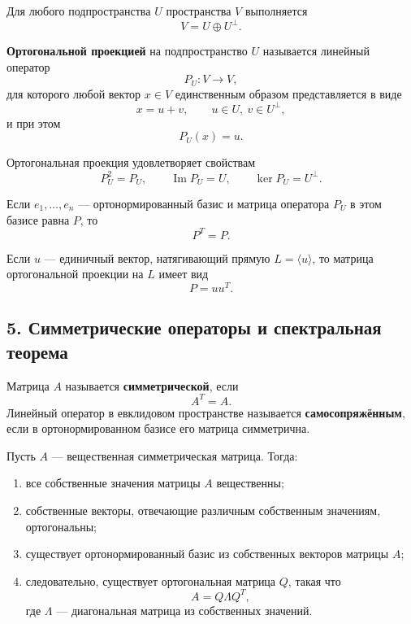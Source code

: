 Для любого подпространства $U$ пространства $V$ выполняется
\[
V = U \oplus U^\perp.
\]

\begin{definition}
\textbf{Ортогональной проекцией} на подпространство $U$ называется линейный оператор
\[
P_U:V \to V,
\]
для которого любой вектор $x \in V$ единственным образом представляется в виде
\[
x = u + v, \qquad u \in U,\ v \in U^\perp,
\]
и при этом
\[
P_U(x)=u.
\]
\end{definition}

Ортогональная проекция удовлетворяет свойствам
\[
P_U^2 = P_U, \qquad \operatorname{Im} P_U = U, \qquad \ker P_U = U^\perp.
\]

Если $e_1,\dots,e_n$ — ортонормированный базис и матрица оператора $P_U$ в этом базисе равна $P$, то
\[
P^T = P.
\]

Если $u$ — единичный вектор, натягивающий прямую $L = \langle u \rangle$, то матрица ортогональной проекции на $L$ имеет вид
\[
P = uu^T.
\]

\vspace{1em}

\subsection*{5. Симметрические операторы и спектральная теорема}

\begin{definition}
Матрица $A$ называется \textbf{симметрической}, если
\[
A^T = A.
\]
Линейный оператор в евклидовом пространстве называется \textbf{самосопряжённым}, если в ортонормированном базисе его матрица симметрична.
\end{definition}

\begin{theorem}
Пусть $A$ — вещественная симметрическая матрица. Тогда:
\begin{enumerate}
    \item все собственные значения матрицы $A$ вещественны;
    \item собственные векторы, отвечающие различным собственным значениям, ортогональны;
    \item существует ортонормированный базис из собственных векторов матрицы $A$;
    \item следовательно, существует ортогональная матрица $Q$, такая что
    \[
    A = Q \Lambda Q^T,
    \]
    где $\Lambda$ — диагональная матрица из собственных значений.
\end{enumerate}
\end{theorem}

